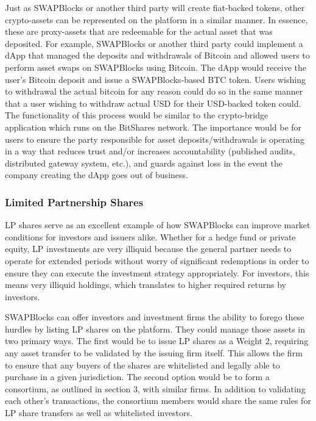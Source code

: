 \documentclass[12pt]{article}
\begin{document}
Just as SWAPBlocks or another third party will create fiat-backed tokens, other crypto-assets can be 
represented on the platform in a similar manner. In essence, these are proxy-assets that are redeemable 
for the actual asset that was deposited. For example, SWAPBlocks or another third party could implement a 
dApp that managed the deposits and withdrawals of Bitcoin and allowed users to perform asset swaps on SWAPBlocks 
using Bitcoin. The dApp would receive the user’s Bitcoin deposit and issue a SWAPBlocks-based BTC token. Users 
wishing to withdrawal the actual bitcoin for any reason could do so in the same manner that a user wishing to 
withdraw actual USD for their USD-backed token could. The functionality of this process would be similar to the 
crypto-bridge application which runs on the BitShares network. The importance would be for users to ensure the 
party responsible for asset deposits/withdrawals is operating in a way that reduces trust and/or increases 
accountability (published audits, distributed gateway system, etc.), and guards against loss in the event the 
company creating the dApp goes out of business.

\subsubsection{Limited Partnership Shares}

LP shares serve as an excellent example of how SWAPBlocks can improve market conditions for investors and 
issuers alike. Whether for a hedge fund or private equity, LP investments are very illiquid because the 
general partner needs to operate for extended periods without worry of significant redemptions in order to 
ensure they can execute the investment strategy appropriately. For investors, this means very illiquid holdings, 
which translates to higher required returns by investors.

SWAPBlocks can offer investors and investment firms the ability to forego these hurdles by listing LP shares on the 
platform. They could manage those assets in two primary ways. The first would be to issue LP shares as a Weight 2, 
requiring any asset transfer to be validated by the issuing firm itself. This allows the firm to ensure that any 
buyers of the shares are whitelisted and legally able to purchase in a given jurisdiction. The second option would 
be to form a consortium, as outlined in section 3, with similar firms. In addition to validating each other’s 
transactions, the consortium members would share the same rules for LP share transfers as well as whitelisted investors.
\end{document}
